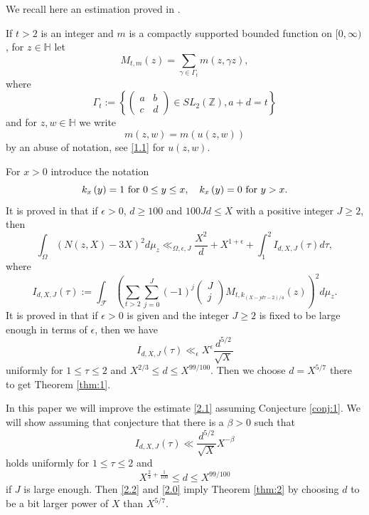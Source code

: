 \documentclass[12pt]{amsart}
\theoremstyle{definition}
\numberwithin{equation}{section}
\newcommand{\HH}{\mathbb{H}}
\begin{document}
We recall here an estimation proved in \cite[Section
5]{Biro}.

If $t>2$ is an integer and $m$ is a compactly supported bounded function on
$[0,\infty )$, for $z\in\HH$ let
\[M_{t,m}(z)=\sum_{\gamma\in\Gamma_t}m\left(z,\gamma z\right),\]
where
\[\Gamma_t:=\left\{\begin{pmatrix}a&b\\ c&d\end{pmatrix}\in SL_2(\mathbb{
Z}),a+d=t\right\}\]
and for $z,w\in\HH$ we write
\[m(z,w)=m\left(u(z,w)\right)\]
by an abuse of notation, see \eqref{1.1} for $u(z,w)$.

For $x>0$ introduce the notation
\[k_x\left(y\right)=1\mbox{\rm \ for $0\le y\le x$},\quad k_x\left
(y\right)=0\mbox{\rm \ for $y>x$}.\]
It is proved in \cite[(5.16), (5.17)]{Biro} that if $\epsilon >0$,
$d\ge 100$ and $100Jd\le X$ with a positive integer $J\ge 2$, then
\begin{equation}\int_{\Omega}\left(N\left(z,X\right)-3X\right)^2d
\mu_z\ll_{\Omega ,\epsilon ,J}\frac {X^2}d+X^{1+\epsilon}+\int_1^
2I_{d,X,J}\left(\tau\right)d\tau ,\label{2.0}\end{equation}
where $ $
\[I_{d,X,J}\left(\tau\right):=\int_{\mathcal F}\left(\sum_{t>2}\sum_{
j=0}^J\left(-1\right)^j\left(\begin{array}{c}
J\\
j\end{array}
\right)M_{t,k_{\left(X-jd\tau -2\right)/4}}\left(z\right)\right)^
2d\mu_z.\]
It is proved in \cite[(5.18) and Section 6]{Biro} that if $\epsilon
>0$ is given and the
integer $J\ge 2$ is fixed to be large enough in terms of $\epsilon$,
then we have
\begin{equation}_{}I_{d,X,J}\left(\tau\right)\ll_{\epsilon}X^{\epsilon}\frac {
d^{5/2}}{\sqrt {X}}\label{2.1}\end{equation}
uniformly for $1\le\tau\le 2$ and $X^{2/3}\le d\le X^{99/100}$. Then we
choose $d=X^{5/7}$ there to get Theorem \ref{thm:1}.

In this paper we will improve the estimate \eqref{2.1}
assuming Conjecture \ref{conj:1}. We will show assuming
that conjecture that there is a $\beta >0$ such that
\begin{equation}I_{d,X,J}\left(\tau\right)\ll\frac {d^{5/2}}{\sqrt {
X}}X^{-\beta}\label{2.2}\end{equation}
holds uniformly for $1\le\tau\le 2$ and
\begin{equation}X^{\frac 23+\frac 1{100}}\le d\le X^{99/100}\label{201}\end{equation}
if $J$ is large enough. Then \eqref{2.2} and \eqref{2.0} imply
Theorem \ref{thm:2} by choosing $d$ to be a bit larger
power of $X$ than $ $$X^{5/7}$.
\end{document}
